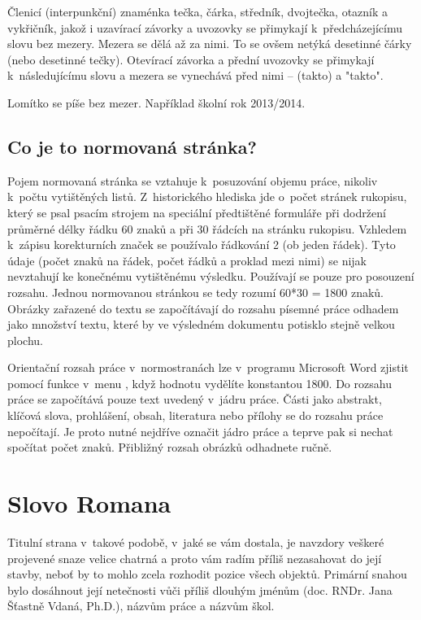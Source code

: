 \documentclass{template/socthesis}
\begin{document}
Členicí (interpunkční) znaménka tečka, čárka, středník, dvojtečka, otazník a vykřičník, jakož i uzavírací závorky a uvozovky se přimykají k~předcházejícímu slovu bez mezery. Mezera se dělá až za nimi. To se ovšem netýká desetinné čárky (nebo desetinné tečky). Otevírací závorka a přední uvozovky se přimykají k~následujícímu slovu a mezera se vynechává před nimi – (takto) a "takto".

Lomítko se píše bez mezer. Například školní rok 2013/2014. 

\subsection{Co je to normovaná stránka?}
Pojem normovaná stránka se vztahuje k~posuzování objemu práce, nikoliv k~počtu vytištěných listů. Z~historického hlediska jde o~počet stránek rukopisu, který se psal psacím strojem na speciální předtištěné formuláře při dodržení průměrné délky řádku 60 znaků a při 30 řádcích na stránku rukopisu. Vzhledem k~zápisu korekturních značek se používalo řádkování 2 (ob jeden řádek). Tyto údaje (počet znaků na řádek, počet řádků a proklad mezi nimi) se nijak nevztahují ke konečnému vytištěnému výsledku. Používají se pouze pro posouzení rozsahu. Jednou normovanou stránkou se tedy rozumí 60*30 = 1800 znaků. Obrázky zařazené do textu se započítávají do rozsahu písemné práce odhadem jako množství textu, které by ve výsledném dokumentu potisklo stejně velkou plochu.

Orientační rozsah práce v~normostranách lze v~programu Microsoft Word zjistit pomocí funkce  v~menu , když hodnotu  vydělíte konstantou 1800. Do rozsahu práce se započítává pouze text uvedený v~jádru práce. Části jako abstrakt, klíčová slova, prohlášení, obsah, literatura nebo přílohy se do rozsahu práce nepočítají. Je proto nutné nejdříve označit jádro práce a teprve pak si nechat spočítat počet znaků. Přibližný rozsah obrázků odhadnete ručně.

\newpage
\section{Slovo Romana}
Titulní strana v~takové podobě, v~jaké se vám dostala, je navzdory veškeré projevené snaze velice chatrná a proto vám radím příliš nezasahovat do její stavby, neboť by to mohlo zcela rozhodit pozice všech objektů. Primární snahou bylo dosáhnout její netečnosti vůči příliš dlouhým jménům (doc. RNDr. Jana Šťastně Vdaná, Ph.D.), názvům práce a názvům škol.
\end{document}
